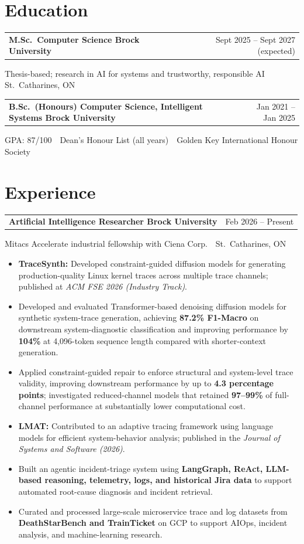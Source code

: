 \documentclass[10pt,letterpaper]{extarticle}
\makeatletter
\newcommand{\entry}[2]{%
  \vspace{2.5pt}%
  \noindent
  \begin{tabular*}{\textwidth}{@{}l@{\extracolsep{\fill}}r@{}}
    \textbf{#1} & {\color{muted}\small #2} \\
  \end{tabular*}
  \par\vspace{-1pt}%
}
\newcommand{\meta}[1]{%
  {\color{muted}\small #1}\par\vspace{1pt}%
}
\makeatother
\begin{document}
\section{Education}

\entry{M.Sc.\ Computer Science \textnormal{\textbar} Brock University}
{Sept 2025 -- Sept 2027 (expected)}
\meta{Thesis-based; research in AI for systems and trustworthy, responsible AI \,\textbar\, St.\ Catharines, ON}

\entry{B.Sc.\ (Honours) Computer Science, Intelligent Systems \textnormal{\textbar} Brock University}
{Jan 2021 -- Jan 2025}
\meta{GPA: 87/100 \,\textbar\, Dean's Honour List (all years) \,\textbar\, Golden Key International Honour Society}

\section{Experience}

\entry{Artificial Intelligence Researcher \textnormal{\textbar} Brock University}
{Feb 2026 -- Present}
\meta{Mitacs Accelerate industrial fellowship with Ciena Corp. \,\textbar\, St.\ Catharines, ON}

\begin{itemize}
\item \textbf{TraceSynth:} Developed constraint-guided diffusion models for generating production-quality Linux kernel traces across multiple trace channels; published at \textit{ACM FSE 2026 (Industry Track)}.

\item Developed and evaluated Transformer-based denoising diffusion models for synthetic system-trace generation, achieving \textbf{87.2\% F1-Macro} on downstream system-diagnostic classification and improving performance by \textbf{104\%} at 4,096-token sequence length compared with shorter-context generation.

\item Applied constraint-guided repair to enforce structural and system-level trace validity, improving downstream performance by up to \textbf{4.3 percentage points}; investigated reduced-channel models that retained \textbf{97--99\%} of full-channel performance at substantially lower computational cost.

\item \textbf{LMAT:} Contributed to an adaptive tracing framework using language models for efficient system-behavior analysis; published in the \textit{Journal of Systems and Software (2026)}.

\item Built an agentic incident-triage system using \textbf{LangGraph, ReAct, LLM-based reasoning, telemetry, logs, and historical Jira data} to support automated root-cause diagnosis and incident retrieval.

\item Curated and processed large-scale microservice trace and log datasets from \textbf{DeathStarBench and TrainTicket} on GCP to support AIOps, incident analysis, and machine-learning research.
\end{itemize}
\end{document}
